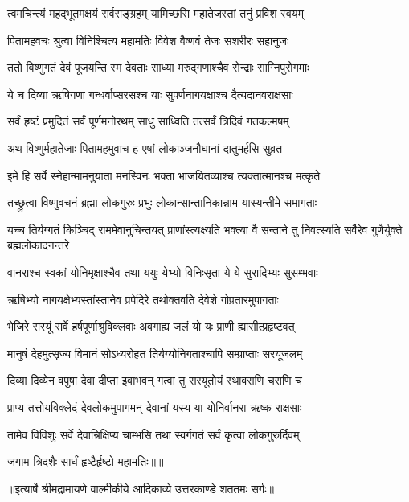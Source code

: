 \twolineshloka
{त्वमचिन्त्यं महद्भूतमक्षयं सर्वसङ्ग्रहम्}
{यामिच्छसि महातेजस्तां तनुं प्रविश स्वयम्} %

\twolineshloka
{पितामहवचः श्रुत्वा विनिश्चित्य महामतिः}
{विवेश वैष्णवं तेजः सशरीरः सहानुजः} %

\twolineshloka
{ततो विष्णुगतं देवं पूजयन्ति स्म देवताः}
{साध्या मरुद्गणाश्चैव सेन्द्राः साग्निपुरोगमाः} %

\twolineshloka
{ये च दिव्या ऋषिगणा गन्धर्वाप्सरसश्च याः}
{सुपर्णनागयक्षाश्च दैत्यदानवराक्षसाः} %

\twolineshloka
{सर्वं हृष्टं प्रमुदितं सर्वं पूर्णमनोरथम्}
{साधु साध्विति तत्सर्वं त्रिदिवं गतकल्मषम्} %

\twolineshloka
{अथ विष्णुर्महातेजाः पितामहमुवाच ह}
{एषां लोकाञ्जनौघानां दातुमर्हसि सुव्रत} %

\twolineshloka
{इमे हि सर्वे स्नेहान्मामनुयाता मनस्विनः}
{भक्ता भाजयितव्याश्च त्यक्तात्मानश्च मत्कृते} %

\twolineshloka
{तच्छ्रुत्वा विष्णुवचनं ब्रह्मा लोकगुरुः प्रभुः}
{लोकान्सान्तानिकान्नाम यास्यन्तीमे समागताः} %

\threelineshloka
{यच्च तिर्यग्गतं किञ्चिद् राममेवानुचिन्तयत्}
{प्राणांस्त्यक्ष्यति भक्त्या वै सन्ताने तु निवत्स्यति}
{सर्वैरेव गुणैर्युक्ते ब्रह्मलोकादनन्तरे} %

\twolineshloka
{वानराश्च स्वकां योनिमृक्षाश्चैव तथा ययुः}
{येभ्यो विनिःसृता ये ये सुरादिभ्यः सुसम्भवाः} %

\twolineshloka
{ऋषिभ्यो नागयक्षेभ्यस्तांस्तानेव प्रपेदिरे}
{तथोक्तवति देवेशे गोप्रतारमुपागताः} %

\twolineshloka
{भेजिरे सरयूं सर्वे हर्षपूर्णाश्रुविक्लवाः}
{अवगाह्य जलं यो यः प्राणी ह्यासीत्प्रहृष्टवत्} %

\twolineshloka
{मानुषं देहमुत्सृज्य विमानं सोऽध्यरोहत}
{तिर्यग्योनिगताश्चापि सम्प्राप्ताः सरयूजलम्} %

\twolineshloka
{दिव्या दिव्येन वपुषा देवा दीप्ता इवाभवन्}
{गत्वा तु सरयूतोयं स्थावराणि चराणि च} %

\twolineshloka
{प्राप्य तत्तोयविक्लेदं देवलोकमुपागमन्}
{देवानां यस्य या योनिर्वानरा ऋष्क राक्षसाः} %

\twolineshloka
{तामेव विविशुः सर्वे देवान्निक्षिप्य चाम्भसि}
{तथा स्वर्गगतं सर्वं कृत्वा लोकगुरुर्दिवम्} %

{जगाम त्रिदशैः सार्धं हृष्टैर्हृष्टो महामतिः॥॥} %

\addtocounter{shlokacount}{1}


{॥इत्यार्षे श्रीमद्रामायणे वाल्मीकीये आदिकाव्ये उत्तरकाण्डे शततमः सर्गः॥}

